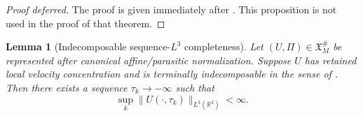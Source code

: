 \documentclass[11pt]{amsart}
\numberwithin{equation}{section}
\theoremstyle{plain}
\newtheorem{lemma}[lemma]{Lemma}
\theoremstyle{definition}
\theoremstyle{remark}
\newcommand{\R}{\mathbb R}
\begin{document}
\begin{proof}[Proof deferred]
The proof is given immediately after
.  This proposition is not used in
the proof of that theorem.
\end{proof}

\begin{lemma}[Indecomposable sequence-\(L^3\) completeness]
\label{lem:atomic-sequence-L3}
Let \((U,\Pi)\in\mathfrak X_M^\#\) be represented after canonical
affine/parasitic normalization.  Suppose \(U\) has retained local velocity
concentration and is terminally indecomposable in the sense of
.  Then there exists a sequence
\(\tau_k\to-\infty\) such that
\[
   \sup_k\|U(\cdot,\tau_k)\|_{L^3(\R^3)}<\infty .
\]
\end{lemma}
\end{document}
